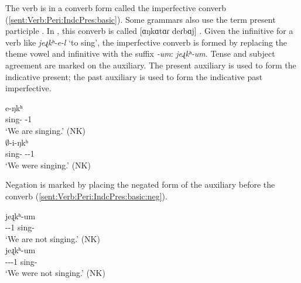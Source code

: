\begin{sloppypar}
The verb is in a converb form called the imperfective converb (\ref{sent:Verb:Peri:IndcPres:basic}). Some grammars also use the term present participle \citep[219]{DumTragut-2009-ArmenianReferenceGrammar}. In {\seaSEA}, this converb is called [ɑŋkɑtɑɾ deɾbɑj] . Given the infinitive for a verb like \textit{{jeɻkʰ-e-l}} `to sing', the imperfective converb is formed by replacing the theme vowel and infinitive with the suffix \textit{{-um}}: \textit{{jeɻkʰ-um}}. Tense and subject agreement are marked on the auxiliary. The present auxiliary is used to form the indicative present; the past auxiliary is used to form the indicative past imperfective. 
\end{sloppypar}

\begin{exe}
	\ex \label{sent:Verb:Peri:IndcPres:basic}
	\begin{xlist}
		\ex {} {e-ŋkʰ}
		\\
		sing-{\impfcvb} {\auxgloss}-1{\pl}
		\\
		\trans			`We are singing.' \hfill (NK)
		\\
		\ex {} {$\emptyset$-i-ŋkʰ}
		\\
		sing-{\impfcvb} {\auxgloss}-{\pst}-1{\pl}
		\\
		\trans			`We were singing.' \hfill (NK)
		\\
	\end{xlist}
\end{exe}

Negation is marked by placing the negated form of the auxiliary before the converb (\ref{sent:Verb:Peri:IndcPres:basic:neg}).

\begin{exe}
	\ex \label{sent:Verb:Peri:IndcPres:basic:neg}
	\begin{xlist}
		\ex {} {jeɻkʰ-um}
		\\
		{\neggloss}-{\auxgloss}-1{\pl} sing-{\impfcvb} 
		\\
		\trans			`We are not singing.' \hfill (NK)
		\\
		\armenian{Չենք երգում։}
		\ex {} {jeɻkʰ-um}
		\\
		{\neggloss}-{\auxgloss}-{\pst}-1{\pl} sing-{\impfcvb} 
		\\
		\trans			`We were not singing.' \hfill (NK)
		\\
		\armenian{Չինք երգում։}
	\end{xlist}
\end{exe}

